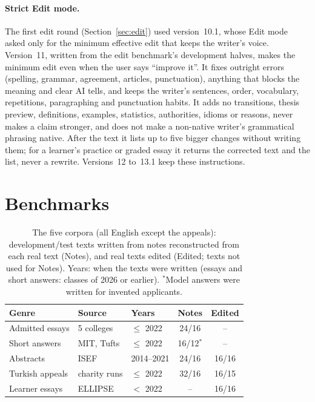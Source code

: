 \documentclass[11pt]{article}
\newcommand{\shipver}{13.1}
\begin{document}
\paragraph{Strict Edit mode.} The first edit round (Section~\ref{sec:edit}) used version~10.1, whose Edit mode asked only for the minimum effective edit that keeps the writer's voice. Version~11, written from the edit benchmark's development halves, makes the minimum edit even when the user says ``improve it''. It fixes outright errors (spelling, grammar, agreement, articles, punctuation), anything that blocks the meaning and clear AI tells, and keeps the writer's sentences, order, vocabulary, repetitions, paragraphing and punctuation habits. It adds no transitions, thesis preview, definitions, examples, statistics, authorities, idioms or reasons, never makes a claim stronger, and does not make a non-native writer's grammatical phrasing native. After the text it lists up to five bigger changes without writing them; for a learner's practice or graded essay it returns the corrected text and the list, never a rewrite. Versions~12 to~\shipver{} keep these instructions.

\section{Benchmarks}
\label{sec:bench}

\begin{table}[t]
\centering\small
\setlength{\tabcolsep}{2.5pt}
\begin{tabular}{lllcc}
\toprule
Genre & Source & Years & Notes & Edited \\
\midrule
Admitted essays & 5 colleges & $\le$ 2022 & 24/16 & -- \\
Short answers & MIT, Tufts & $\le$ 2022 & 16/12$^{*}$ & -- \\
Abstracts & ISEF & 2014--2021 & 24/16 & 16/16 \\
Turkish appeals & charity runs & $\le$ 2022 & 32/16 & 16/15 \\
Learner essays & ELLIPSE & $<$ 2022 & -- & 16/16 \\
\bottomrule
\end{tabular}
\caption{The five corpora (all English except the appeals): development/test texts written from notes reconstructed from each real text (Notes), and real texts edited (Edited; texts not used for Notes). Years: when the texts were written (essays and short answers: classes of 2026 or earlier). $^{*}$Model answers were written for invented applicants.}
\label{tab:corpora}
\end{table}
\end{document}
